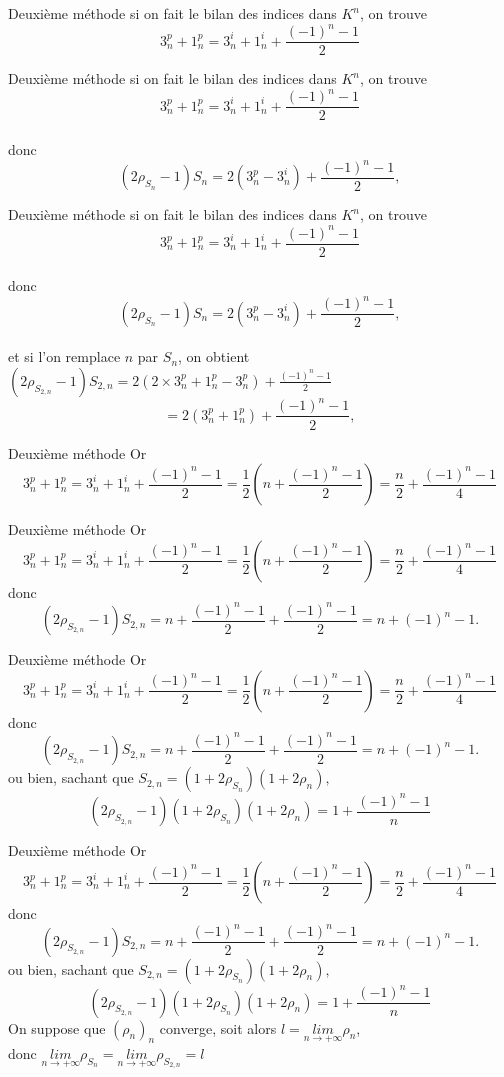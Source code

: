 \documentclass[12pt]{beamer}
\begin{document}
\begin{frame}[t]{Deuxième méthode}
si on fait le bilan des indices dans $K^n$, on trouve $$ 3_n^p+1_n^p=3_n^i+1_n^i+\dfrac{(-1)^n-1}{2}$$
\end{frame}
\begin{frame}[t]{Deuxième méthode}
si on fait le bilan des indices dans $K^n$, on trouve $$ 3_n^p+1_n^p=3_n^i+1_n^i+\dfrac{(-1)^n-1}{2}$$ \\ donc 
$$(2\rho_{S_n}-1)S_n=2(3_n^p-3_n^i)+\frac{(-1)^n-1}{2},$$
\end{frame}%
\begin{frame}[t]{Deuxième méthode}
si on fait le bilan des indices dans $K^n$, on trouve $$ 3_n^p+1_n^p=3_n^i+1_n^i+\dfrac{(-1)^n-1}{2}$$ \\ donc 
$$(2\rho_{S_n}-1)S_n=2(3_n^p-3_n^i)+\frac{(-1)^n-1}{2},$$\\ 
et si l'on remplace $n$ par $S_n$, on obtient \\$(2\rho_{S_{2,n}}-1)S_{2,n}=2(2 \times 3_n^p+1_n^p-3_n^p)+ \frac{(-1)^n-1}{2}$ \\ $$=2(3_n^p+1_n^p)+\frac{(-1)^n-1}{2},$$
\end{frame}
\begin{frame}[t]{Deuxième méthode}
Or $$3_n^p+1_n^p=3_n^i+1_n^i+\frac{(-1)^n-1}{2}=\frac{1}{2}(n+\frac{(-1)^n-1}{2})=\frac{n}{2}+\frac{(-1)^n-1}{4}$$
\end{frame}
\begin{frame}[t]{Deuxième méthode}
Or $$3_n^p+1_n^p=3_n^i+1_n^i+\frac{(-1)^n-1}{2}=\frac{1}{2}(n+\frac{(-1)^n-1}{2})=\frac{n}{2}+\frac{(-1)^n-1}{4}$$
donc $$(2\rho_S_{2,n}-1)S_{2,n}=n+\frac{(-1)^n-1}{2}+\frac{(-1)^n-1}{2}=n+(-1)^n-1.$$ 
\end{frame}%
\begin{frame}[t]{Deuxième méthode}
Or $$3_n^p+1_n^p=3_n^i+1_n^i+\frac{(-1)^n-1}{2}=\frac{1}{2}(n+\frac{(-1)^n-1}{2})=\frac{n}{2}+\frac{(-1)^n-1}{4}$$
donc $$(2\rho_S_{2,n}-1)S_{2,n}=n+\frac{(-1)^n-1}{2}+\frac{(-1)^n-1}{2}=n+(-1)^n-1.$$ 
ou bien, sachant que $S_{2,n}=(1+2\rho_{S_n})(1+2\rho_n),$ $$(2\rho_{S_{2,n}}-1)(1+2\rho_{S_n})(1+2\rho_n)=1+\frac{(-1)^n-1}{n}$$ 
\end{frame}
\begin{frame}[t]{Deuxième méthode}
Or $$3_n^p+1_n^p=3_n^i+1_n^i+\frac{(-1)^n-1}{2}=\frac{1}{2}(n+\frac{(-1)^n-1}{2})=\frac{n}{2}+\frac{(-1)^n-1}{4}$$
donc $$(2\rho_S_{2,n}-1)S_{2,n}=n+\frac{(-1)^n-1}{2}+\frac{(-1)^n-1}{2}=n+(-1)^n-1.$$ 
ou bien, sachant que $S_{2,n}=(1+2\rho_{S_n})(1+2\rho_n),$ $$(2\rho_{S_{2,n}}-1)(1+2\rho_{S_n})(1+2\rho_n)=1+\frac{(-1)^n-1}{n}$$
 On suppose que $(\rho_n)_n$ converge, soit alors $l=\underset{n\rightarrow + \infty}{l i m}\rho_n$,\\
 donc 
$\underset{n\rightarrow + \infty}{l i m}\rho_{S_n}=\underset{n\rightarrow + \infty}{l i m}\rho_{S_{2,n}}=l$
\end{frame}
\end{document}
